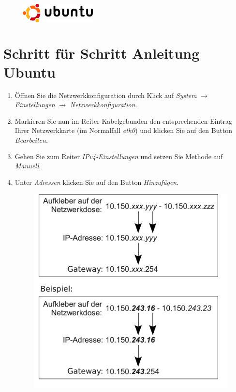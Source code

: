 \documentclass[a4paper,12pt]{scrartcl}
\begin{document}
\pagebreak

\begin{figure}[t!]
	\raggedleft
	\vspace{-20pt}
	\includegraphics[height=1cm,keepaspectratio]{Bilder/Ubuntu_logo}
	\vspace{-30pt}
\end{figure}



\section*{Schritt für Schritt Anleitung Ubuntu}

\begin{enumerate}
	\item Öffnen Sie die Netzwerkkonfiguration durch Klick auf \emph{System} $\rightarrow$ \emph{Einstellungen} $\rightarrow$ \emph{Netzwerkkonfiguration}.
	\item Markieren Sie nun im Reiter Kabelgebunden den entsprechenden Eintrag Ihrer Netzwerkkarte (im Normalfall \emph{eth0}) und klicken Sie auf den Button \emph{Bearbeiten}.
	\item Gehen Sie zum Reiter \emph{IPv4-Einstellungen} und setzen Sie Methode auf \emph{Manuell}.
	\item Unter \emph{Adressen} klicken Sie auf den Button \emph{Hinzufügen}.
	\begin{figure}[h!]
		\centering
		\begin{minipage}[c]{0.45\linewidth}
			\centering
			\includegraphics[width=\linewidth,keepaspectratio]{Bilder/IP_Gerneric}

\end{minipage}
\end{figure}
\end{enumerate}
\end{document}
